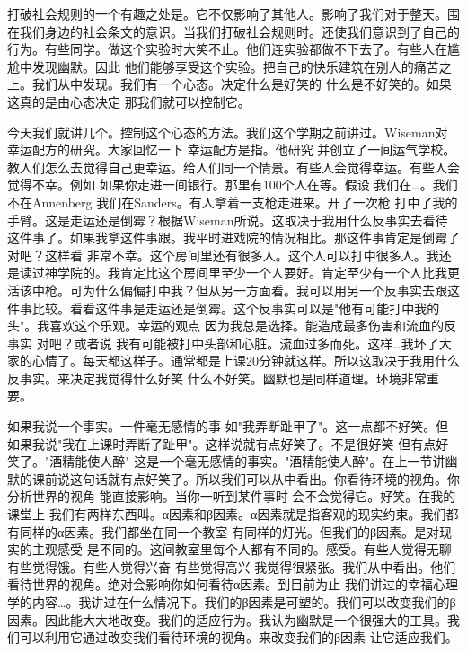打破社会规则的一个有趣之处是。它不仅影响了其他人。影响了我们对于整天。围在我们身边的社会条文的意识。当我们打破社会规则时。还使我们意识到了自己的行为。有些同学。做这个实验时大笑不止。他们连实验都做不下去了。有些人在尴尬中发现幽默。因此 他们能够享受这个实验。把自己的快乐建筑在别人的痛苦之上。我们从中发现。我们有一个心态。决定什么是好笑的 什么是不好笑的。如果这真的是由心态决定 那我们就可以控制它。 

今天我们就讲几个。控制这个心态的方法。我们这个学期之前讲过。Wiseman对幸运配方的研究。大家回忆一下 幸运配方是指。他研究 并创立了一间运气学校。教人们怎么去觉得自己更幸运。给人们同一个情景。有些人会觉得幸运。有些人会觉得不幸。例如 如果你走进一间银行。那里有100个人在等。假设 我们在…。我们不在Annenberg 我们在Sanders。有人拿着一支枪走进来。开了一次枪 打中了我的手臂。这是走运还是倒霉？根据Wiseman所说。这取决于我用什么反事实去看待这件事了。如果我拿这件事跟。我平时进戏院的情况相比。那这件事肯定是倒霉了 对吧？这样看 非常不幸。这个房间里还有很多人。这个人可以打中很多人。我还是读过神学院的。我肯定比这个房间里至少一个人要好。肯定至少有一个人比我更活该中枪。可为什么偏偏打中我？但从另一方面看。我可以用另一个反事实去跟这件事比较。看看这件事是走运还是倒霉。这个反事实可以是"他有可能打中我的头"。我喜欢这个乐观。幸运的观点 因为我总是选择。能造成最多伤害和流血的反事实 对吧？或者说 我有可能被打中头部和心脏。流血过多而死。这样…我坏了大家的心情了。每天都这样子。通常都是上课20分钟就这样。所以这取决于我用什么反事实。来决定我觉得什么好笑 什么不好笑。幽默也是同样道理。环境非常重要。 

如果我说一个事实。一件毫无感情的事 如"我弄断趾甲了"。这一点都不好笑。但如果我说"我在上课时弄断了趾甲"。这样说就有点好笑了。不是很好笑 但有点好笑了。"酒精能使人醉" 这是一个毫无感情的事实。"酒精能使人醉"。在上一节讲幽默的课前说这句话就有点好笑了。所以我们可以从中看出。你看待环境的视角。你分析世界的视角 能直接影响。当你一听到某件事时 会不会觉得它。好笑。在我的课堂上 我们有两样东西叫。α因素和β因素。α因素就是指客观的现实约束。我们都有同样的α因素。我们都坐在同一个教室 有同样的灯光。但我们的β因素。是对现实的主观感受 是不同的。这间教室里每个人都有不同的。感受。有些人觉得无聊 有些觉得饿。有些人觉得兴奋 有些觉得高兴 我觉得很紧张。我们从中看出。他们看待世界的视角。绝对会影响你如何看待α因素。到目前为止 我们讲过的幸福心理学的内容…。我讲过在什么情况下。我们的β因素是可塑的。我们可以改变我们的β因素。因此能大大地改变。我们的适应行为。我认为幽默是一个很强大的工具。我们可以利用它通过改变我们看待环境的视角。来改变我们的β因素 让它适应我们。 


